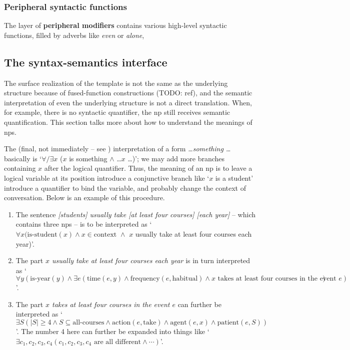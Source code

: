 \documentclass[UTF8, a4paper, oneside, scheme=plain]{ctexrep}
\newcommand*{\concept}[1]{\textbf{#1}}
\newcommand{\corpus}[1]{\emph{#1}}
\newcommand{\translate}[1]{`#1'}
\begin{document}
\subsubsection{Peripheral syntactic functions}

The layer of \concept{peripheral modifiers} contains 
various high-level syntactic functions,
filled by adverbs like \corpus{even} or \corpus{alone},


\subsection{The syntax-semantics interface}\label{sec:np.semantics}

The surface realization of the template  
is not the same as the underlying structure
because of fused-function constructions (TODO: ref),
and the semantic interpretation of even the underlying structure 
is not a direct translation.
When, for example, there is no syntactic quantifier,
the \acs{np} still receives semantic quantification.
This section talks more about how to understand the meanings of \acs{np}s.

The (final, not immediately -- see ) 
interpretation of a form \corpus{\dots something \dots} basically is 
\translate{$\forall/\exists x$ ($x$ is something $\land$ \dots $x$ \dots)};
we may add more branches containing $x$ after the logical quantifier.
Thus, the meaning of an \acs{np} 
is to leave a logical variable at its position
introduce a conjunctive branch like \translate{$x$ is a student}
introduce a quantifier to bind the variable,
and probably change the context of conversation.
Below is an example of this procedure.
\begin{enumerate}
    \item The sentence \corpus{[students] usually take [at least four courses] [each year]}
    -- which contains three \acs{np}s -- 
    is to be interpreted as 
    \translate{$\forall x (
        \text{is-student} (x) \land 
        x \in \text{context } \land$
        $x$ usually take at least four courses each year)}.
    \item The part \corpus{$x$ usually take at least four courses each year} 
    is in turn interpreted as 
    \translate{$\forall y (
        \text{is-year}(y) \land 
        \exists e (
            \text{time}(e, y) \land 
            \text{frequency} (e, \text{habitual}) \land 
            \text{$x$ takes at least four courses in the event $e$})
    )$}.
    \item The part \corpus{$x$ takes at least four courses in the event $e$} 
    can further be interpreted as 
    \translate{$
        \exists S (
            |S| \geq 4 \land 
            S \subseteq \text{all-courses} \land 
            \text{action}(e, \text{take}) \land 
            \text{agent}(e, x) \land 
            \text{patient}(e, S)
        )
    $}.
    The number 4 here can further be expanded into things like 
    \translate{$
        \exists c_1, c_2, c_3, c_4 (
            \text{$c_1, c_2, c_3, c_4$ are all different} \land 
            \cdots
        )
    $}.
\end{enumerate}
\end{document}
